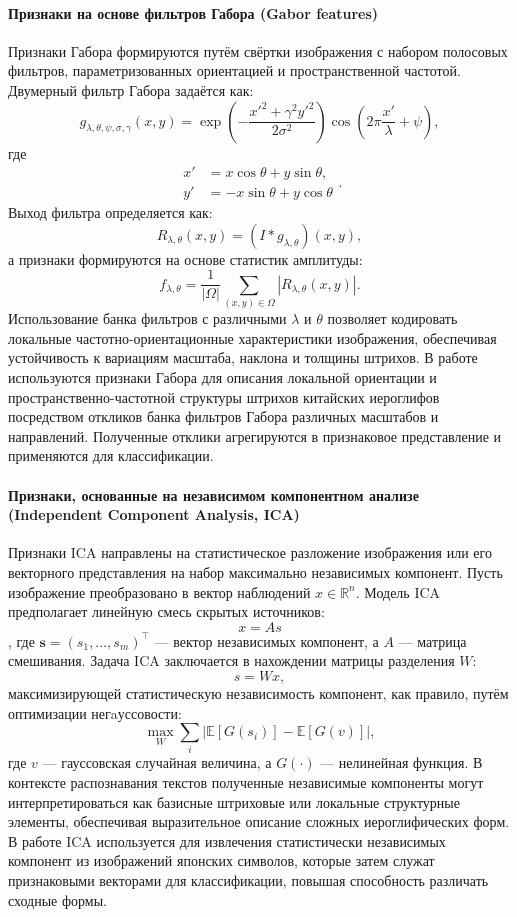 \paragraph{Признаки на основе фильтров Габора (Gabor features)} Признаки Габора \cite{gabor1946theory} формируются путём свёртки изображения с набором полосовых фильтров, параметризованных ориентацией и пространственной частотой. Двумерный фильтр Габора задаётся как:
\[
    g_{\lambda,\theta,\psi,\sigma,\gamma}(x,y)
    =
    \exp\!\left(
    -\frac{x'^2 + \gamma^2 y'^2}{2\sigma^2}
    \right)
    \cos\!\left(
    2\pi \frac{x'}{\lambda} + \psi
    \right),
\]
где
\[
    \begin{aligned}
        x' & = x \cos\theta + y \sin\theta, \\
        y' & = -x \sin\theta + y \cos\theta
    \end{aligned}.
\]
Выход фильтра определяется как:
\[
    R_{\lambda,\theta}(x,y)
    =
    (I * g_{\lambda,\theta})(x,y),
\]
а признаки формируются на основе статистик амплитуды:
\[
    f_{\lambda,\theta}
    =
    \frac{1}{|\Omega|}
    \sum_{(x,y)\in\Omega}
    \left|
    R_{\lambda,\theta}(x,y)
    \right|.
\]
Использование банка фильтров с различными $\lambda$ и $\theta$ позволяет кодировать локальные частотно-ориентационные характеристики изображения, обеспечивая устойчивость к вариациям масштаба, наклона и толщины штрихов. В работе \cite{hamamoto1995recognition} используются признаки Габора для описания локальной ориентации и пространственно-частотной структуры штрихов китайских иероглифов посредством откликов банка фильтров Габора различных масштабов и направлений. Полученные отклики агрегируются в признаковое представление и применяются для классификации.

\paragraph{Признаки, основанные на независимом компонентном анализе (Independent Component Analysis, ICA)} Признаки ICA \cite{comon1994independent} направлены на статистическое разложение изображения или его векторного представления на набор максимально независимых компонент. Пусть изображение преобразовано в вектор наблюдений \(x\in\mathbb{R}^n\). Модель ICA предполагает линейную смесь скрытых источников:
\[
    x = As
\],
где $\mathbf{s} = (s_1, \ldots, s_m)^\top$ — вектор независимых компонент, а $A$ — матрица смешивания. Задача ICA заключается в нахождении матрицы разделения $W$:
\[
    s = Wx,
\]
максимизирующей статистическую независимость компонент, как правило, путём оптимизации негaуссовости:
\[
    \max_W
    \sum_i
    \left|
    \mathbb{E}[G(s_i)]
    -
    \mathbb{E}[G(v)]
    \right|,
\]
где $v$ — гауссовская случайная величина, а $G(\cdot)$ — нелинейная функция. В контексте распознавания текстов полученные независимые компоненты могут интерпретироваться как базисные штриховые или локальные структурные элементы, обеспечивая выразительное описание сложных иероглифических форм. В работе \cite{ozawa1999application} ICA используется для извлечения статистически независимых компонент из изображений японских символов, которые затем служат признаковыми векторами для классификации, повышая способность различать сходные формы.

